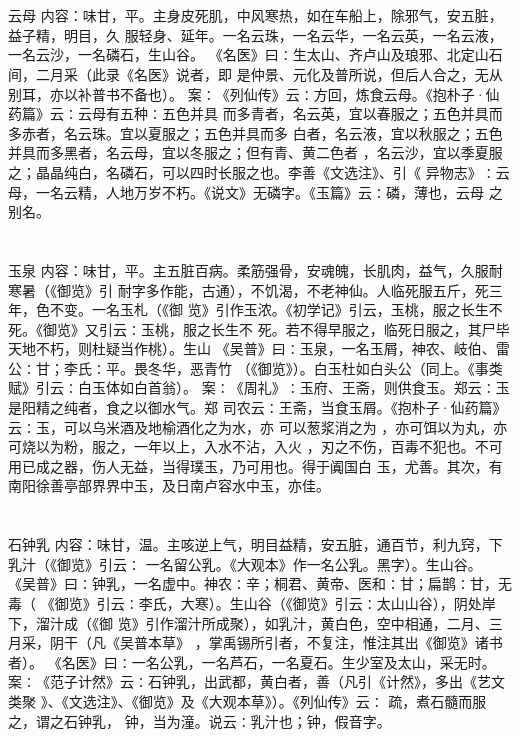 \documentclass[12pt,UTF8]{ctexbook}
\begin{document}
\chapter{}云母
内容：味甘，平。主身皮死肌，中风寒热，如在车船上，除邪气，安五脏，益子精，明目，久 
服轻身、延年。一名云珠，一名云华，一名云英，一名云液，一名云沙，一名磷石，生山谷。 
《名医》曰∶生太山、齐卢山及琅邪、北定山石间，二月采（此录《名医》说者，即 
是仲景、元化及普所说，但后人合之，无从别耳，亦以补普书不备也）。 
案∶《列仙传》云∶方回，炼食云母。《抱朴子·仙药篇》云∶云母有五种∶五色并具 
而多青者，名云英，宜以春服之；五色并具而多赤者，名云珠。宜以夏服之；五色并具而多 
白者，名云液，宜以秋服之；五色并具而多黑者，名云母，宜以冬服之；但有青、黄二色者 
，名云沙，宜以季夏服之；晶晶纯白，名磷石，可以四时长服之也。李善《文选注》、引《 
异物志》∶云母，一名云精，人地万岁不朽。《说文》无磷字。《玉篇》云∶磷，薄也，云母 
之别名。 

\chapter{}玉泉
内容：味甘，平。主五脏百病。柔筋强骨，安魂魄，长肌肉，益气，久服耐寒暑（《御览》引 
耐字多作能，古通），不饥渴，不老神仙。人临死服五斤，死三年，色不变。一名玉札（《御 
览》引作玉浓。《初学记》引云，玉桃，服之长生不死。《御览》又引云∶玉桃，服之长生不 
死。若不得早服之，临死日服之，其尸毕天地不朽，则杜疑当作桃）。生山 
《吴普》曰∶玉泉，一名玉屑，神农、岐伯、雷公∶甘；李氏∶平。畏冬华，恶青竹 
（《御览》）。白玉杜如白头公（同上。《事类赋》引云∶白玉体如白首翁）。 
案∶《周礼》∶玉府、王斋，则供食玉。郑云∶玉是阳精之纯者，食之以御水气。郑 
司农云∶王斋，当食玉屑。《抱朴子·仙药篇》云∶玉，可以乌米酒及地榆酒化之为水，亦 
可以葱浆消之为 ，亦可饵以为丸，亦可烧以为粉，服之，一年以上，入水不沾，入火 
，刃之不伤，百毒不犯也。不可用已成之器，伤人无益，当得璞玉，乃可用也。得于阗国白 
玉，尤善。其次，有南阳徐善亭部界界中玉，及日南卢容水中玉，亦佳。 

\chapter{}石钟乳
内容：味甘，温。主咳逆上气，明目益精，安五脏，通百节，利九窍，下乳汁（《御览》引云∶ 
一名留公乳。《大观本》作一名公乳。黑字）。生山谷。 
《吴普》曰∶钟乳，一名虚中。神农∶辛；桐君、黄帝、医和∶甘；扁鹊∶甘，无毒（ 
《御览》引云∶李氏，大寒）。生山谷（《御览》引云∶太山山谷），阴处岸下，溜汁成（《御 
览》引作溜汁所成聚），如乳汁，黄白色，空中相通，二月、三月采，阴干（凡《吴普本草》 
，掌禹锡所引者，不复注，惟注其出《御览》诸书者）。 
《名医》曰∶一名公乳，一名芦石，一名夏石。生少室及太山，采无时。 
案∶《范子计然》云∶石钟乳，出武都，黄白者，善（凡引《计然》，多出《艺文类聚 
》、《文选注》、《御览》及《大观本草》）。《列仙传》云∶ 疏，煮石髓而服之，谓之石钟乳， 
钟，当为潼。说云∶乳汁也；钟，假音字。 
\end{document}
